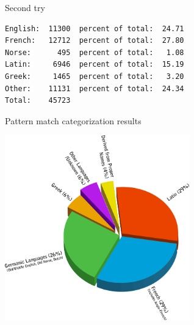 \documentclass[10pt]{beamer}
\begin{document}
  



  





\begin{frame}[fragile]{Second try}
\pause
\begin{verbatim}
English:  11300  percent of total:  24.71
French:   12712  percent of total:  27.80
Norse:      495  percent of total:   1.08
Latin:     6946  percent of total:  15.19
Greek:     1465  percent of total:   3.20
Other:    11131  percent of total:  24.34
Total:    45723

\end{verbatim}

\end{frame}

\begin{frame}[fragile]{Pattern match categorization results}
  
  \centerline{\includegraphics[width=8cm]{badchart.png}}

\end{frame}
\end{document}
